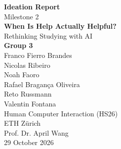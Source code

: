 \documentclass[11pt]{article}
\begin{document}
\thispagestyle{empty}
\begin{center}
\vspace*{3cm}
{\Huge\bfseries Ideation Report}\\[1.2cm]
{\Large Milestone 2}\\[2.5cm]
{\LARGE\bfseries When Is Help Actually Helpful?}\\[0.6cm]
{\large Rethinking Studying with AI}\\[3cm]
{\Large\bfseries Group 3}\\[0.8cm]
Franco Fierro Brandes\\
Nicolas Ribeiro\\
Noah Faoro\\
Rafael Bragança Oliveira\\
Reto Russmann\\
Valentin Fontana\\[2.5cm]
Human Computer Interaction (HS26)\\
ETH Zürich\\[0.4cm]
Prof. Dr. April Wang\\[1cm]
29 October 2026
\end{center}
\newpage





\end{document}
